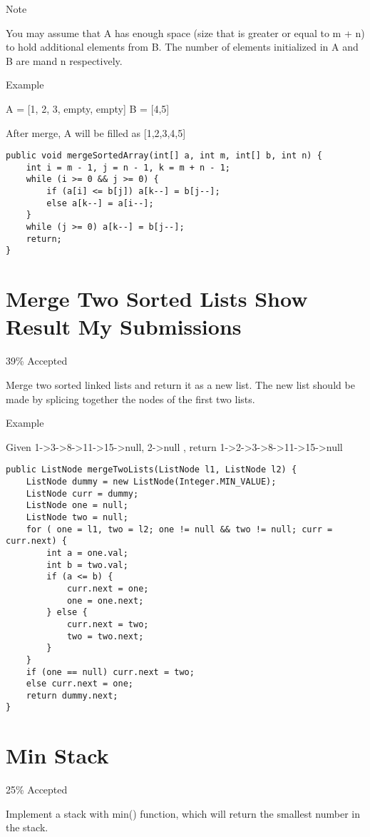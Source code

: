 \documentclass[9pt, b5paaper]{book}
\begin{document}
Note

You may assume that A has enough space (size that is greater or equal to m + n) to hold additional elements from B. The number of elements initialized in A and B are mand n respectively.

Example

A = [1, 2, 3, empty, empty] B = [4,5]

After merge, A will be filled as [1,2,3,4,5]
\begin{verbatim}
public void mergeSortedArray(int[] a, int m, int[] b, int n) {
    int i = m - 1, j = n - 1, k = m + n - 1;
    while (i >= 0 && j >= 0) {
        if (a[i] <= b[j]) a[k--] = b[j--];
        else a[k--] = a[i--];
    }
    while (j >= 0) a[k--] = b[j--];
    return;
}
\end{verbatim}
\section{Merge Two Sorted Lists Show Result My Submissions}
\label{sec-1-45}

39\% Accepted

Merge two sorted linked lists and return it as a new list. The new list should be made by splicing together the nodes of the first two lists.

Example

Given 1->3->8->11->15->null, 2->null , return 1->2->3->8->11->15->null
\begin{verbatim}
public ListNode mergeTwoLists(ListNode l1, ListNode l2) {
    ListNode dummy = new ListNode(Integer.MIN_VALUE);
    ListNode curr = dummy;
    ListNode one = null;
    ListNode two = null;
    for ( one = l1, two = l2; one != null && two != null; curr = curr.next) {
        int a = one.val;
        int b = two.val;
        if (a <= b) {
            curr.next = one;
            one = one.next;
        } else {
            curr.next = two;
            two = two.next;
        }
    }
    if (one == null) curr.next = two;
    else curr.next = one;
    return dummy.next;
}
\end{verbatim}
\section{Min Stack}
\label{sec-1-46}

25\% Accepted

Implement a stack with min() function, which will return the smallest number in the stack.
\end{document}
